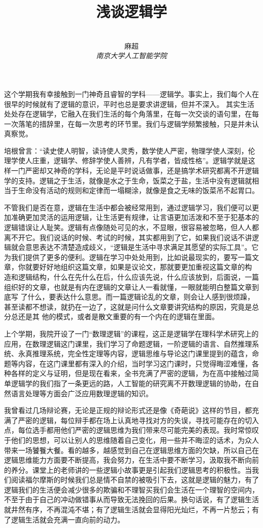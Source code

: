 \documentclass[12pt,a4paper]{ctexart}
\title{\textbf{浅谈逻辑学}}
\author{
\\
\Large{麻超 \quad 201300066}
\\[6pt]
{ \large \textit{南京大学人工智能学院}}\\[2pt]
}
\date{}
\begin{document}
\maketitle
\setcounter{page}{1}
这个学期我有幸接触到一门神奇且睿智的学科——逻辑学。事实上，我们每个人在很早的时候就有了逻辑的意识，平时也总是要求讲逻辑，但并不深入。
其实生活处处存在逻辑学，它融入在我们生活的每个角落里，在每一次交谈的语句里，在每一次落笔的措辞里，在每一次思考的环节里。我们与逻辑学频繁接触，只是并未认真察觉。

培根曾言：“读史使人明智，读诗使人灵秀，数学使人严密，物理学使人深刻，伦理学使人庄重，逻辑学、修辞学使人善辨，凡有学者，皆成性格”。逻辑学就是这样一门严密却又神奇的学科，无论是平时说话做事，还是搞学术研究都离不开逻辑学的支持。逻辑之于生活，就像是水之于生命，饭菜之于盐，生活中没有逻辑就相当于生命没有活动的规则和定律而一塌糊涂，就像是食之无味的饭菜吊不起胃口。

不管我们是否在意，逻辑在生活中都会被经常用到，通过逻辑学习，我们便可以更加准确更加灵活的运用逻辑，让生活更有规律，让言语更加活泼和不至于犯基本的逻辑错误让人耻笑。逻辑有点像随处可见的水，不显眼，很容易被忽略，但人人都离不开它。我们说话的时候、考试的时候，其实都用到了它，如果我们说话不讲逻辑就会意思表达不清楚造成歧义，“逻辑是生活中寻求满足其愿望的实际工具”。它为我们提供了更多的便利。逻辑在学习中处处用到，比如说最现实的，要写一篇文章，你就要好好地组织这篇文章，如果是议论文，那就要更加重视这篇文章的构
造和逻辑结构，什么在先什么在后，什么应该先说，什么应该放到，后面说，一篇组织好的文章，也就是有内在逻辑的文章让人一看就懂，一眼就能明白整篇文章到底写
了什么，要表达什么意思。而一篇逻辑论乱的文章，则会让人感到很烦躁，甚至读都不想读，就扔在一边了，这就是问什么文章要讲究结构的原因，究竟是总分总还是其
他的模式，或者是散文重要的有一个内在的逻辑在里面。

上个学期，我院开设了一门“数理逻辑”的课程，这正是逻辑学在理科学术研究上的应用，在数理逻辑这门课里，我们学习了命题逻辑，一阶逻辑的语言、自然推理系统、永真推理系统，完全性定理等内容，逻辑思维与导论这门课里提到的蕴含，命题等内容，在这门课里都有深入的介绍，当时学习这门课时，只觉得晦涩难懂，各种各样的定义与证明，但是现在看来，全书充满了严密的逻辑，为在高中接触过简单逻辑学的我们指了一条更远的路，人工智能的研究离不开数理逻辑的协助，在自然语言处理等方面会广泛应用数理逻辑的知识。

我曾看过几场辩论赛，无论是正规的辩论形式还是像《奇葩说》这样的节目，都充满了严密的逻辑，每位辩手都在场上认真地寻找对方的失误，寻找可能存在的切入点，每位选手都用他们严密的逻辑思维为我们带来尽可能完美的表现。我时常惊叹于他们的思想，可以让别人的思维随着自己变化，用一些并不晦涩的话术，为众人带来一场饕餮大餐。看的越多，越感觉到自己在逻辑思维方面的欠缺，所以自己在逻辑思维能力方面要不断提高，我会努力，在生活中要不断学习，汲取我不断向前的养分。课堂上的老师讲的一些逻辑小故事更是引起我们逻辑思考的积极性。当我们阅读福尔摩斯的时候我们总是情不自禁的被吸引下去，这就是逻辑的魅力，有了逻辑我们的生活便会减少很多的欺骗和不理智买我们会生活在一个理智的空间内，不至于由于自己的冲动做错事从而导致无法挽回的后果。换句话说，有了逻辑生活就井然有序，不再混沌不堪；有了逻辑生活就会显得阳光灿烂，不再一片愁云；有了逻辑生活就会充满一直向前的动力。
\end{document}
